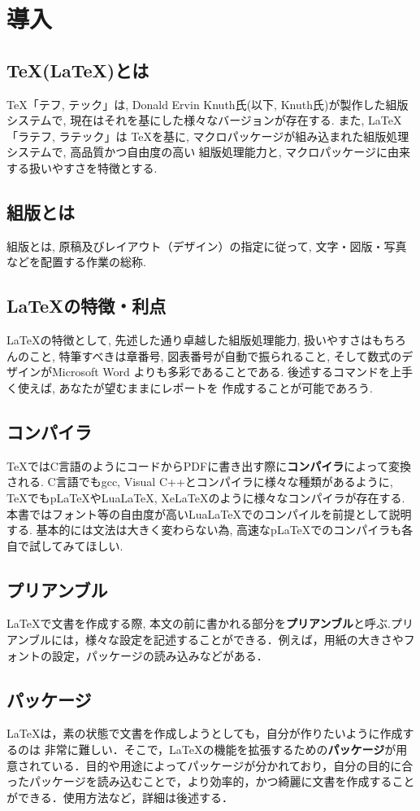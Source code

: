 \section{導入}
\subsection{\TeX(\LaTeX)とは}
\TeX 「テフ, テック」は, Donald Ervin Knuth氏(以下, Knuth氏)が製作した組版システム\cite{W3C2021}で, 
現在はそれを基にした様々なバージョンが存在する. また, \LaTeX 「ラテフ, ラテック」は
\TeX を基に, マクロパッケージが組み込まれた組版処理システムで, 高品質かつ自由度の高い
組版処理能力と, マクロパッケージに由来する扱いやすさを特徴とする. 
\subsection{組版とは}
組版とは, 原稿及びレイアウト（デザイン）の指定に従って, 文字・図版・写真などを配置する作業の総称. 
\subsection{\LaTeX の特徴・利点}
\LaTeX の特徴として, 先述した通り卓越した組版処理能力, 扱いやすさはもちろんのこと, 
特筆すべきは章番号, 図表番号が自動で振られること, そして数式のデザインがMicrosoft Word
よりも多彩であることである. 後述するコマンドを上手く使えば, あなたが望むままにレポートを
作成することが可能であろう. 
\subsection{コンパイラ}
\TeX ではC言語のようにコードからPDFに書き出す際に\textbf{コンパイラ}によって変換される. 
C言語でもgcc, Visual C++とコンパイラに様々な種類があるように, \TeX でもpLaTeXやLuaLaTeX, 
XeLaTeXのように様々なコンパイラが存在する. 
本書ではフォント等の自由度が高いLuaLaTeXでのコンパイルを前提として説明する. 
基本的には文法は大きく変わらない為, 高速なpLaTeXでのコンパイラも各自で試してみてほしい. 
\subsection{プリアンブル}
\LaTeX で文書を作成する際, 本文の前に書かれる部分を\textbf{プリアンブル}と呼ぶ.プリアンブルには，様々な設定を記述することができる．例えば，用紙の大きさやフォントの設定，パッケージの読み込みなどがある．
\subsection{パッケージ}
\LaTeX は，素の状態で文書を作成しようとしても，自分が作りたいように作成するのは
非常に難しい．そこで，\LaTeX の機能を拡張するための\textbf{パッケージ}が用意されている．目的や用途によってパッケージが分かれており，自分の目的に合ったパッケージを読み込むことで，より効率的，かつ綺麗に文書を作成することができる．使用方法など，詳細は後述する．